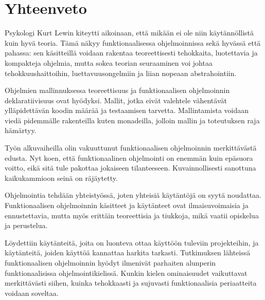 \clearpage%
\vspace{21.5pt}
\chapter{Yhteenveto}

Psykologi Kurt Lewin kiteytti aikoinaan, että mikään ei ole niin käytännöllistä kuin hyvä teoria. Tämä näkyy funktionaalisessa ohjelmoinnissa sekä hyvässä että pahassa: sen käsitteillä voidaan rakentaa teoreettisesti tehokkaita, luotettavia ja kompakteja ohjelmia, mutta sokea teorian seuraaminen voi johtaa tehokkuushaittoihin, luettavuusongelmiin ja liian nopeaan abstrahointiin.

Ohjelmien mallinnuksessa teoreettisuus ja funktionaalisen ohjelmoinnin deklaratiivisuus ovat hyödyksi. Mallit, jotka eivät valehtele vähentävät ylläpidettävän koodin määrää ja testaamisen tarvetta. Mallintamista voidaan viedä pidemmälle rakenteilla kuten monadeilla, jolloin mallin ja toteutuksen raja hämärtyy.

Työn alkuvaiheilla olin vakuuttunut funktionaalisen ohjelmoinnin merkittävästä
edusta. Nyt koen, että funktionaalinen ohjelmointi on enemmän kuin epäsuora voitto, eikä sitä tule pakottaa jokaiseen tilanteeseen. Kuvainnollisesti sanottuna kaikukammioon seinä on räjäytetty.

Ohjelmointia tehdään yhteistyössä, joten yhteisiä käytäntöjä on syytä noudattaa. Funktionaalisen ohjelmoinnin käsitteet ja käytänteet ovat ilmaisuvoimaisia ja ennustettavia, mutta myös erittäin teoreettisia ja tiukkoja, mikä vaatii opiskelua ja perustelua.

Löydettiin käytänteitä, joita on luonteva ottaa käyttöön tuleviin projekteihin, ja käytänteitä, joiden käyttöä kannattaa harkita tarkasti. Tutkimuksen lähteissä funktionaalisen ohjelmoinnin hyödyt ilmenivät parhaiten alunperin funktionaalisissa ohjelmointikielissä. Kunkin kielen ominaisuudet vaikuttavat merkittävästi siihen, kuinka tehokkaasti ja sujuvasti funktionaalisia periaatteita voidaan soveltaa.